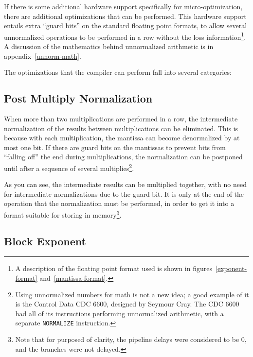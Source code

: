 If there is some additional hardware support specifically for
micro-optimization, there are additional optimizations that can be
performed.  This hardware support entails extra ``guard bits'' on the
standard floating point formats, to allow several unnormalized operations to
be performed in a row without the loss information\footnote{A description of
the floating point format used is shown in figures~\ref{exponent-format}
and~\ref{mantissa-format}.}.  A discussion of the mathematics behind
unnormalized arithmetic is in appendix~\ref{unnorm-math}.

The optimizations that the compiler can perform fall into several categories:

\subsection{Post Multiply Normalization}

When more than two multiplications are performed in a row, the intermediate
normalization of the results between multiplications can be eliminated.
This is because with each multiplication, the mantissa can become
denormalized by at most one bit.  If there are guard bits on the mantissas
to prevent bits from ``falling off'' the end during multiplications, the
normalization can be postponed until after a sequence of several
multiplies\footnote{Using unnormalized numbers for math is not a new idea; a
good example of it is the Control Data CDC 6600, designed by Seymour Cray.
\cite{thornton:cdc6600} The CDC 6600 had all of its instructions performing
unnormalized arithmetic, with a separate {\tt NORMALIZE} instruction.}.

%

As you can see, the intermediate results can be multiplied together, with no
need for intermediate normalizations due to the guard bit.  It is only at
the end of the operation that the normalization must be performed, in order
to get it into a format suitable for storing in memory\footnote{Note that
for purposed of clarity, the pipeline delays were considered to be 0, and
the branches were not delayed.}.

\subsection{Block Exponent}

